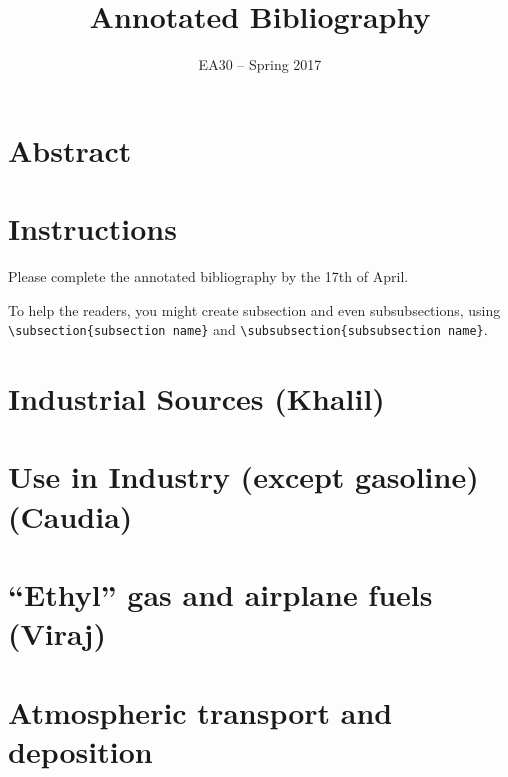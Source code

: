 \documentclass{article}\usepackage[]{graphicx}\usepackage[]{color}
\author{EA30 -- Spring 2017}
\title{Annotated Bibliography}
\begin{document}
\maketitle
{}

\section{Abstract}



\tableofcontents

\section{Instructions}

Please complete the annotated bibliography by the 17th of April.


To help the readers, you might create subsection and even subsubsections, using \verb!\subsection{subsection name}! and \verb!\subsubsection{subsubsection name}!. 


\section{Industrial Sources (Khalil)}


\section{Use in Industry (except gasoline) (Caudia)}

\section{``Ethyl'' gas and airplane fuels (Viraj)}

\section{Atmospheric transport and deposition}
\begin{itemize}

\end{itemize}
\end{document}
